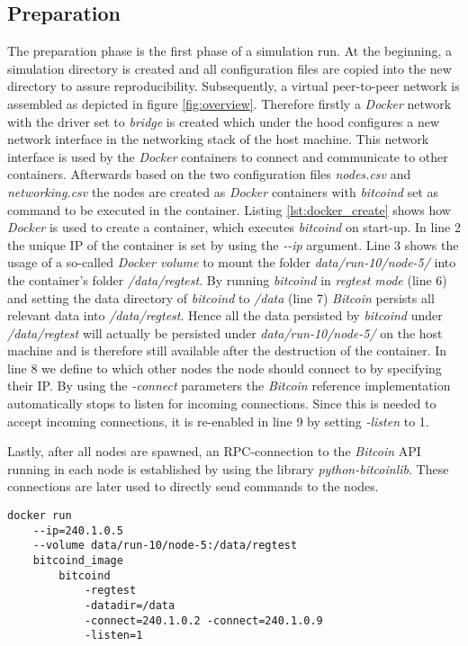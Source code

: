 \subsection{Preparation}

The preparation phase is the first phase of a simulation run.
At the beginning, a simulation directory is created and all configuration files are copied into the new directory to assure reproducibility.
Subsequently, a virtual peer-to-peer network is assembled as depicted in figure \ref{fig:overview}.
Therefore firstly a \textit{Docker} network with the driver set to \textit{bridge} is created which under the hood configures a new network interface in the networking stack of the host machine.
This network interface is used by the \textit{Docker} containers to connect and communicate to other containers.
Afterwards based on the two configuration files \textit{nodes.csv} and \textit{networking.csv} the nodes are created as \textit{Docker} containers with \textit{bitcoind} set as command to be executed in the container.
Listing \ref{lst:docker_create} shows how \textit{Docker} is used to create a container, which executes \textit{bitcoind} on start-up.
In line 2 the unique IP of the container is set by using the \textit{-{}-ip} argument.
Line 3 shows the usage of a so-called \textit{Docker volume} to mount the folder \textit{data/run-10/node-5/} into the container's folder \textit{/data/regtest}.
By running \textit{bitcoind} in \textit{regtest mode} (line 6) and setting the data directory of \textit{bitcoind} to \textit{/data} (line 7) \textit{Bitcoin} persists all relevant data into \textit{/data/regtest}.
Hence all the data persisted by \textit{bitcoind} under \textit{/data/regtest} will actually be persisted under \textit{data/run-10/node-5/} on the host machine and is therefore still available after the destruction of the container.
In line 8 we define to which other nodes the node should connect to by specifying their IP.
By using the \textit{-connect} parameters the \textit{Bitcoin} reference implementation automatically stops to listen for incoming connections.
Since this is needed to accept incoming connections, it is re-enabled in line 9 by setting \textit{-listen} to 1.

Lastly, after all nodes are spawned, an RPC-connection to the \textit{Bitcoin} API running in each node is established by using the library \textit{python-bitcoinlib}.
These connections are later used to directly send commands to the nodes.

\begin{minipage}{\linewidth}
\begin{lstlisting}[caption=Simplified version of how a node is started with \textit{Docker} and \textit{bitcoind}, label={lst:docker_create}, basicstyle=\ttfamily, captionpos=b]
docker run
	--ip=240.1.0.5
	--volume data/run-10/node-5:/data/regtest
	bitcoind_image
		bitcoind
			-regtest
			-datadir=/data
			-connect=240.1.0.2 -connect=240.1.0.9
			-listen=1
\end{lstlisting}
\end{minipage}
	
